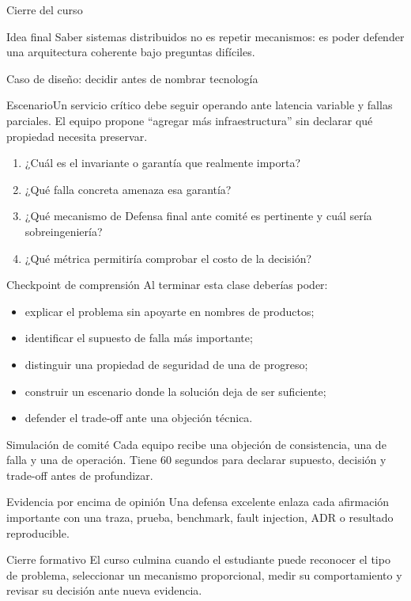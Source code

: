 \documentclass[institutional,screen,none]{ua-engineering-v6-beamer}
\begin{document}
\begin{frame}{Cierre del curso}
\begin{block}{Idea final}
Saber sistemas distribuidos no es repetir mecanismos: es poder defender una arquitectura coherente bajo preguntas difíciles.
\end{block}
\end{frame}


\begin{frame}{Caso de diseño: decidir antes de nombrar tecnología}
\small
\begin{block}{Escenario}Un servicio crítico debe seguir operando ante latencia variable y fallas parciales. El equipo propone ``agregar más infraestructura'' sin declarar qué propiedad necesita preservar.\end{block}
\begin{enumerate}
\item ¿Cuál es el invariante o garantía que realmente importa?
\item ¿Qué falla concreta amenaza esa garantía?
\item ¿Qué mecanismo de Defensa final ante comité es pertinente y cuál sería sobreingeniería?
\item ¿Qué métrica permitiría comprobar el costo de la decisión?
\end{enumerate}
\end{frame}
\begin{frame}{Checkpoint de comprensión}
\small
Al terminar esta clase deberías poder:
\begin{itemize}
\item explicar el problema sin apoyarte en nombres de productos;
\item identificar el supuesto de falla más importante;
\item distinguir una propiedad de seguridad de una de progreso;
\item construir un escenario donde la solución deja de ser suficiente;
\item defender el trade-off ante una objeción técnica.
\end{itemize}
\end{frame}

\begin{frame}{Simulación de comité}
Cada equipo recibe una objeción de consistencia, una de falla y una de operación. Tiene 60 segundos para declarar supuesto, decisión y trade-off antes de profundizar.
\end{frame}
\begin{frame}{Evidencia por encima de opinión}
Una defensa excelente enlaza cada afirmación importante con una traza, prueba, benchmark, fault injection, ADR o resultado reproducible.
\end{frame}
\begin{frame}{Cierre formativo}
El curso culmina cuando el estudiante puede reconocer el tipo de problema, seleccionar un mecanismo proporcional, medir su comportamiento y revisar su decisión ante nueva evidencia.
\end{frame}
\end{document}
